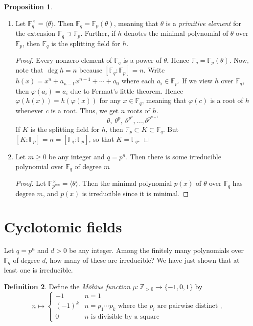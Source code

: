 \documentclass[10pt,letterpaper,cm]{nupset}
\theoremstyle{definition}
\newtheorem{definition}{Definition}[subsection]
\theoremstyle{theorem}
\newtheorem{prop}[definition]{Proposition}
\theoremstyle{remark}
\newcommand{\F}{\mathbb F}
\newcommand{\Z}{\mathbb Z}
\newcommand{\1}{\mathbf{1}}
\newcommand{\0}{\vec 0}
\begin{document}
\begin{prop} $ $
\begin{enumerate}
\item Let $\F_q^{\times} = \langle \theta \rangle$. Then $\F_q =\F_p(\theta)$, meaning that $\theta$ is a \textit{primitive element} for the extension $\F_q \supset \F_p$. Further, if $h$ denotes the minimal polynomial of $\theta$ over $\F_p$, then $\F_q$ is the splitting field for $h$.
\begin{proof}
Every nonzero element of $\F_q$ is a power of $\theta$. Hence $\F_q = \F_p(\theta)$. Now, note that $\deg{h} = n$ because $[\F_q : \F_p]=n$. Write $h(x) = x^n +a_{n-1}x^{n-1}+\cdots + a_0$ where each $a_i \in \F_p$. If we view $h$ over $\F_q$, then $\varphi(a_i) = a_i$ due to Fermat's little theorem. Hence $\varphi(h(x)) = h(\varphi(x))$ for any $x\in \F_q$, meaning that $\varphi(c)$ is a root of $h$ whenever $c$ is a root. Thus, we get $n$ roots of $h$. $$ \theta, \ \theta^p, \ \theta^{p^2}, \ldots, \theta^{p^{n-1}}   $$ If $K$ is the splitting field for $h$, then $\F_p \subset K \subset \F_q$. But $[K :\F_p] = n = [\F_q: \F_p]$, so that $K = \F_q$.
\end{proof}
\item Let $m\geq 0$ be any integer and $q=p^n$. Then there is some irreducible polynomial over $\F_q$ of degree $m$
\begin{proof}
Let $\F_{p^{mn}}^{\times}=\langle \theta \rangle $. Then the minimal polynomial $p(x)$ of $\theta$ over $\F_q$ has degree $m$, and $p(x)$ is irreducible since it is minimal.
\end{proof}
\end{enumerate}
\end{prop}

\section{Cyclotomic fields}


Let $q=p^n$ and $d>0$ be any integer. Among the finitely many polynomials over $\F_q$ of degree $d$, how many of these are irreducible? We have just shown that at least one is irreducible. 


\begin{definition}
Define the \textit{M\"{o}bius function $\mu : \Z_{>0} \to \{{-1}, 0, 1\}$} by $$n \mapsto \begin{cases} {-1} & n=1\\ ({-1})^k & n = p_1\cdots p_k \text{ where the } p_i \text{ are pairwise distinct} \\ 0 & n \text{ is divisible by a square}     \end{cases}    .$$
\end{definition}
\end{document}
